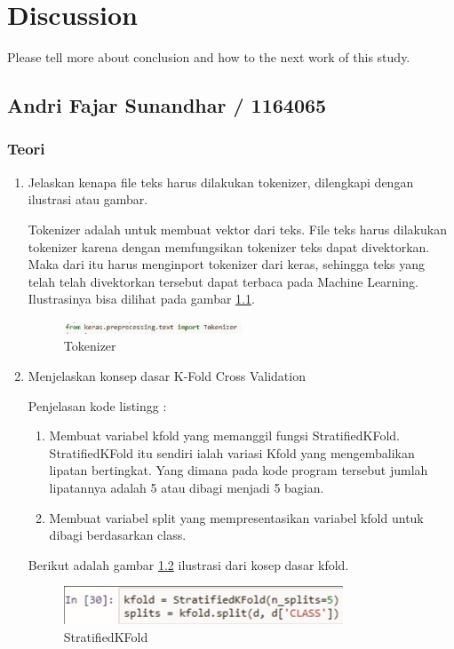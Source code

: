 \chapter{Discussion}
Please tell more about conclusion and how to the next work of this study.

\section{Andri Fajar Sunandhar / 1164065}
\subsection{Teori}
\begin{enumerate}

\item Jelaskan kenapa file teks harus dilakukan tokenizer, dilengkapi dengan ilustrasi atau gambar.
	\par Tokenizer adalah untuk membuat vektor dari teks. File teks harus dilakukan tokenizer karena dengan memfungsikan tokenizer teks dapat divektorkan. Maka dari itu harus menginport tokenizer dari keras, sehingga teks yang telah telah divektorkan tersebut dapat terbaca pada Machine Learning. Ilustrasinya bisa dilihat pada gambar \ref{no1}.
	\begin{figure}[ht]
	\centerline{\includegraphics[width=0.5\textwidth]{figures/chapter7/no1.jpg}}
	\caption{Tokenizer}
	\label{no1}
	\end{figure}

\item Menjelaskan konsep dasar K-Fold Cross Validation
	
	\par Penjelasan kode listingg :
	\begin{enumerate}
	\item Membuat variabel kfold yang memanggil fungsi StratifiedKFold. StratifiedKFold itu sendiri ialah variasi Kfold yang mengembalikan lipatan bertingkat. Yang dimana pada kode program tersebut jumlah lipatannya adalah 5 atau dibagi menjadi 5 bagian.
	\item Membuat variabel split yang mempresentasikan variabel kfold untuk dibagi berdasarkan class.
	\end{enumerate}
	
	\par Berikut adalah gambar  \ref{no2} ilustrasi dari kosep dasar kfold.
		\begin{figure}[!hbtp]
		\centering
		\includegraphics[scale=0.4]{figures/chapter7/no2.jpg}
		\caption{StratifiedKFold}
		\label{no2}
		\end{figure}


\end{enumerate}
